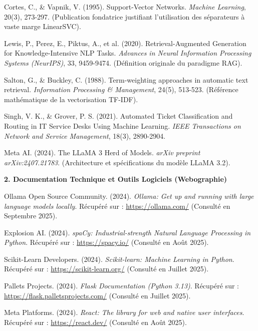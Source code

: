 \documentclass[12pt, a4paper, oneside]{report}
\begin{document}
\noindent [2] Cortes, C., \& Vapnik, V. (1995). Support-Vector Networks. \textit{Machine Learning}, 20(3), 273-297. (Publication fondatrice justifiant l'utilisation des séparateurs à vaste marge LinearSVC).

\noindent [3] Lewis, P., Perez, E., Piktus, A., et al. (2020). Retrieval-Augmented Generation for Knowledge-Intensive NLP Tasks. \textit{Advances in Neural Information Processing Systems (NeurIPS)}, 33, 9459-9474. (Définition originale du paradigme RAG).

\noindent [4] Salton, G., \& Buckley, C. (1988). Term-weighting approaches in automatic text retrieval. \textit{Information Processing \& Management}, 24(5), 513-523. (Référence mathématique de la vectorisation TF-IDF).

\noindent [5] Singh, V. K., \& Grover, P. S. (2021). Automated Ticket Classification and Routing in IT Service Desks Using Machine Learning. \textit{IEEE Transactions on Network and Service Management}, 18(3), 2890-2904.

\noindent [6] Meta AI. (2024). The LLaMA 3 Herd of Models. \textit{arXiv preprint arXiv:2407.21783}. (Architecture et spécifications du modèle LLaMA 3.2).

\vspace{0.8cm}

\noindent\textbf{\large 2. Documentation Technique et Outils Logiciels (Webographie)}

\vspace{0.4cm}

\noindent [1] Ollama Open Source Community. (2024). \textit{Ollama: Get up and running with large language models locally}. Récupéré sur : \url{https://ollama.com/} (Consulté en Septembre 2025).

\noindent [2] Explosion AI. (2024). \textit{spaCy: Industrial-strength Natural Language Processing in Python}. Récupéré sur : \url{https://spacy.io/} (Consulté en Août 2025).

\noindent [3] Scikit-Learn Developers. (2024). \textit{Scikit-learn: Machine Learning in Python}. Récupéré sur : \url{https://scikit-learn.org/} (Consulté en Juillet 2025).

\noindent [4] Pallets Projects. (2024). \textit{Flask Documentation (Python 3.13)}. Récupéré sur : \url{https://flask.palletsprojects.com/} (Consulté en Juillet 2025).

\noindent [5] Meta Platforms. (2024). \textit{React: The library for web and native user interfaces}. Récupéré sur : \url{https://react.dev/} (Consulté en Août 2025).
\end{document}
